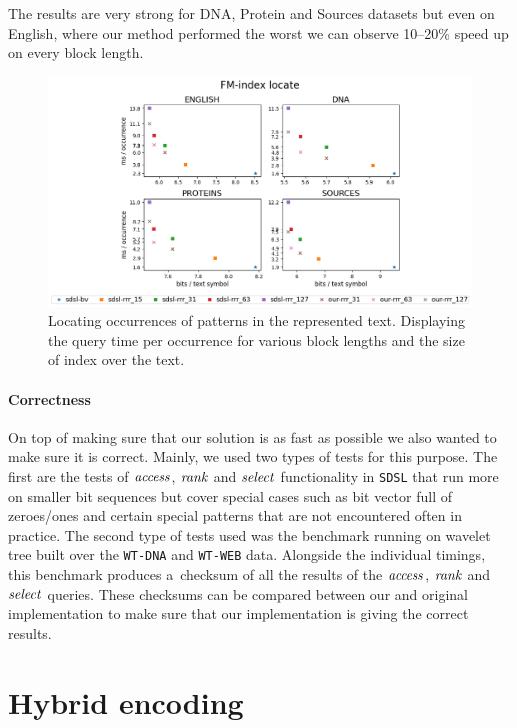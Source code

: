 The results are very strong for DNA, Protein and Sources datasets but even on English, where
our method performed the worst we can observe 10--20\% speed up on every block length.

\begin{figure}
	\centerline{
		\includegraphics[width=\textwidth, height=0.4\textheight]{images/vysledky_sdsl_locate}
	}
	\caption[TODO]{Locating occurrences of patterns in the represented text. Displaying
	the query time per occurrence for various block lengths and the size of index over the
	text.
	}
	\label{obr:benchmark_sdsl_locate}
\end{figure}

\paragraph{Correctness}

On top of making sure that our solution is as fast as possible we also wanted to make sure it is
correct. Mainly, we used two types of tests for this purpose. The first are the tests of $\mathit{access}$,
$\mathit{rank}$ and $\mathit{select}$ functionality in \texttt{SDSL} that run more on smaller bit sequences
but cover special cases such as bit vector full of zeroes/ones and certain special patterns
that are not encountered often in practice. The second type of tests used was the benchmark
running on wavelet tree built over the \texttt{WT-DNA} and \texttt{WT-WEB} data. Alongside
the individual timings, this benchmark produces a~checksum of all the results of the
$\mathit{access}$, $\mathit{rank}$ and $\mathit{select}$ queries. These checksums can be compared between our and original
implementation to make sure that our implementation is giving the correct results.

\section{Hybrid encoding}

